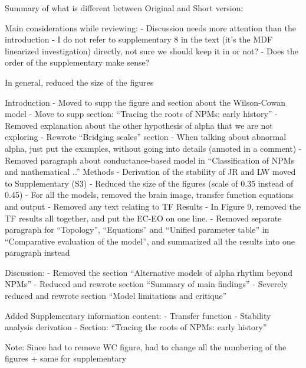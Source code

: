 Summary of what is different between Original and Short version:

Main considerations while reviewing:
- Discussion needs more attention than the introduction
- I do not refer to supplementary 8 in the text (it's the MDF linearized investigation) directly, not sure we should keep it in or not? 
- Does the order of the supplementary make sense?

In general, reduced the size of the figures

Introduction
-	Moved to supp the figure and section about the Wilson-Cowan model
-	Move to supp section: “Tracing the roots of NPMs: early history”
-	Removed explanation about the other hypothesis of alpha that we are not exploring
-	Rewrote “Bridging scales” section
-	When talking about abnormal alpha, just put the examples, without going into details (annoted in a comment)
-	Removed paragraph about conductance-based model in “Classification of NPMs and mathematical ..”
Methods
-	Derivation of the stability of JR and LW moved to Supplementary (S3)
-	Reduced the size of the figures (scale of 0.35 instead of 0.45)
-	For all the models, removed the brain image, transfer function equations and output
-	Removed any text relating to TF 
Results
-	In Figure 9, removed the TF results all together, and put the EC-EO on one line. 
-	Removed separate paragraph for “Topology”, “Equations” and “Unified parameter table” in  “Comparative evaluation of the model”, and summarized all the results into one paragraph instead

Discussion:
-	Removed the section “Alternative models of alpha rhythm beyond NPMs”
-	Reduced and rewrote section “Summary of main findings”
-	Severely reduced and rewrote section “Model limitations and critique” 


Added Supplementary information content:
-	Transfer function
-	Stability analysis derivation
-	Section: “Tracing the roots of NPMs: early history”

Note: Since had to remove WC figure, had to change all the numbering of the figures + same for supplementary

